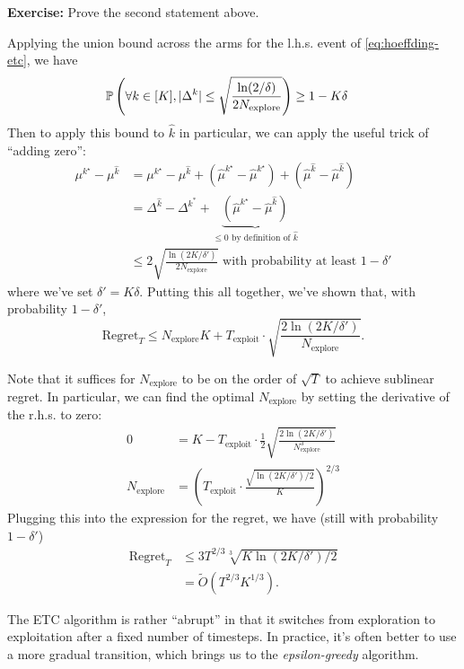 \documentclass[\main/main]{subfiles}
\newcommand{\Nex}{N_{\text{explore}}}
\begin{document}
\textbf{Exercise:} Prove the second statement above.

Applying the union bound across the arms for the l.h.s. event of \ref*{eq:hoeffding-etc}, we have
\begin{align*}
    \P\left( \forall k \in [K], |\Delta^k | \le \sqrt{\frac{\ln(2/\delta)}{2\Nex}} \right) & \ge 1-K\delta
\end{align*}
Then to apply this bound to $\hat k$ in particular, we can apply the useful trick of ``adding zero'':
\begin{align*}
    \mu^{k^\star} - \mu^{\hat k} & = \mu^{k^\star} - \mu^{\hat k} + (\hat \mu^{k^\star} - \hat \mu^{k^\star}) + (\hat \mu^{\hat k} - \hat \mu^{\hat k})              \\
                                 & = \Delta^{\hat k} - \Delta^{k^*} + \underbrace{(\hat \mu^{k^\star} - \hat \mu^{\hat k})}_{\le 0 \text{ by definition of } \hat k} \\
                                 & \le 2 \sqrt{\frac{\ln(2K/\delta')}{2\Nex}} \text{ with probability at least } 1-\delta'
\end{align*}
where we've set $\delta' = K\delta$.
Putting this all together, we've shown that, with probability $1 - \delta'$,
\[
    \text{Regret}_T \le \Nex K + T_{\text{exploit}} \cdot \sqrt{\frac{2\ln(2K/\delta')}{\Nex}}.
\]

Note that it suffices for $\Nex$ to be on the order of $\sqrt{T}$ to achieve sublinear regret. In particular, we can find the optimal $\Nex$ by setting the derivative of the r.h.s. to zero:
\begin{align*}
    0    & = K - T_{\text{exploit}} \cdot \frac{1}{2} \sqrt{\frac{2\ln(2K/\delta')}{\Nex^3}}  \\
    \Nex & = \left( T_{\text{exploit}} \cdot \frac{\sqrt{\ln(2K/\delta')/2}}{K} \right)^{2/3}
\end{align*}
Plugging this into the expression for the regret, we have (still with probability $1-\delta'$)
\begin{align*}
    \text{Regret}_T & \le 3 T^{2/3} \sqrt[3]{K \ln(2K/\delta') / 2} \\
                    & = \tilde{O}(T^{2/3} K^{1/3}).
\end{align*}

The ETC algorithm is rather ``abrupt'' in that it switches from exploration to exploitation after a fixed number of timesteps. In practice, it's often better to use a more gradual transition, which brings us to the \emph{epsilon-greedy} algorithm.
\end{document}
